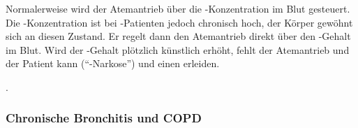 \documentclass[
ngerman,
paper=a4,
asymmetric,
fontsize=10pt,
draft=false,
numbers=noenddot,
bibtotocnumbered,
footnotes=multiple,
]{scrreprt}
\newcommand{\jALTende}{\newline{\color{red}\rule{\linewidth}{2pt}\newline}}
\newcommand{\jNEU}{\vspace{6pt}\noindent{\color{green}\sffamily\textbf{ADDED}\hrulefill\newline}}
\begin{document}
%  
 
 
{
Normalerweise wird der Atemantrieb über die
-Konzentration im Blut gesteuert. Die
-Konzentration ist bei -Patienten jedoch chronisch
hoch, der Körper gewöhnt sich an diesen Zustand. Er
regelt dann den Atemantrieb direkt über den -Gehalt im Blut.
Wird der -Gehalt plötzlich künstlich erhöht, fehlt
der Atemantrieb und der Patient kann
 (\protect\enquote{-Narkose}) und einen
 erleiden.

}{

\SymbolText
}{}{}{}
.
\jALTende

\jNEU
\subsubsection{Chronische
Bronchitis und COPD}
\end{document}
